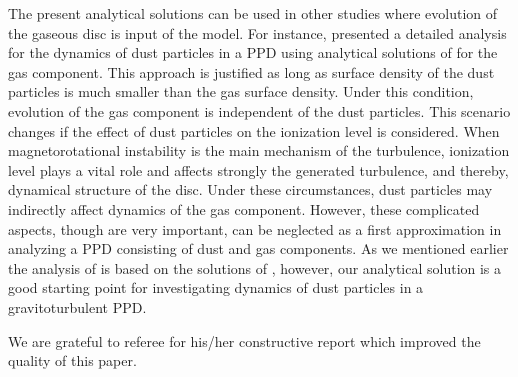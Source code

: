\documentclass[apj]{emulateapj}
\begin{document}
 The present analytical solutions can be used in other studies where evolution of the gaseous disc  is input of the model.  For instance, \cite{Pudritz} presented a detailed analysis for the dynamics of dust particles in a PPD using analytical solutions of \cite{chambers} for the gas component. This approach is justified as long as surface density of the dust particles is much smaller than the gas surface density. Under this condition, evolution of the gas component is independent of the dust particles. This scenario changes if the effect of dust particles on the ionization level is considered. When magnetorotational instability is the main mechanism of the turbulence, ionization level plays a vital role and affects strongly the generated turbulence, and thereby, dynamical structure of the disc. Under these circumstances, dust particles may indirectly affect dynamics of the gas component. However, these complicated aspects, though are very important, can be neglected as a first approximation in analyzing a PPD consisting of dust and gas components. As we mentioned earlier the analysis of \cite{Pudritz} is based on the solutions of \cite{chambers}, however, our analytical solution is a good starting point for investigating dynamics of dust particles in a gravitoturbulent PPD. 









\acknowledgments
We are grateful to referee for his/her constructive report which improved the quality of this paper. 
%










\end{document}
